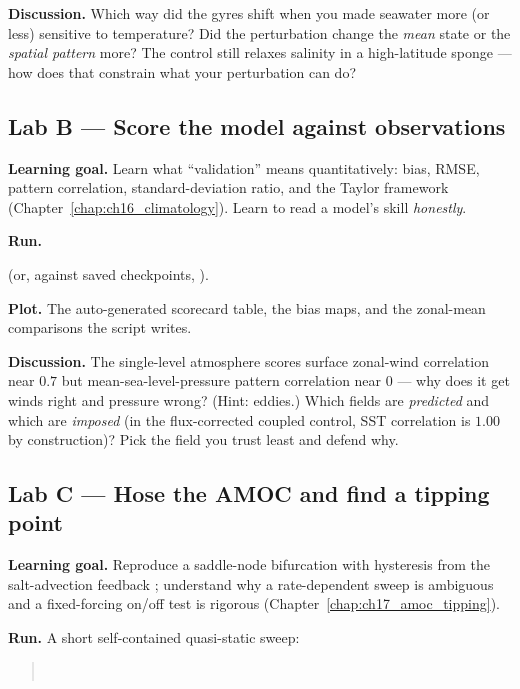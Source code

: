 \textbf{Discussion.} Which way did the gyres shift when you made seawater more (or less) sensitive
to temperature? Did the perturbation change the \emph{mean} state or the \emph{spatial pattern}
more? The control still relaxes salinity in a high-latitude sponge --- how does that constrain
what your perturbation can do?

\subsection{Lab B --- Score the model against observations}

\textbf{Learning goal.} Learn what ``validation'' means quantitatively: bias, RMSE, pattern
correlation, standard-deviation ratio, and the Taylor framework
(Chapter~\ref{chap:ch16_climatology}). Learn to read a model's skill \emph{honestly}.

\textbf{Run.}
\begin{quote}\small
{}
\end{quote}
(or, against saved checkpoints, ).

\textbf{Plot.} The auto-generated scorecard table, the bias maps, and the zonal-mean comparisons
the script writes.

\textbf{Discussion.} The single-level atmosphere scores surface zonal-wind correlation near $0.7$
but mean-sea-level-pressure pattern correlation near $0$ --- why does it get winds right and
pressure wrong? (Hint: eddies.) Which fields are \emph{predicted} and which are \emph{imposed}
(in the flux-corrected coupled control, SST correlation is $1.00$ by construction)? Pick the
field you trust least and defend why.

\subsection{Lab C --- Hose the AMOC and find a tipping point}

\textbf{Learning goal.} Reproduce a saddle-node bifurcation with hysteresis from the
salt-advection feedback \citep{stommel1961}; understand why a rate-dependent sweep is ambiguous
and a fixed-forcing on/off test is rigorous (Chapter~\ref{chap:ch17_amoc_tipping}).

\textbf{Run.} A short self-contained quasi-static sweep:
\begin{quote}\small
{}\\
\end{quote}


